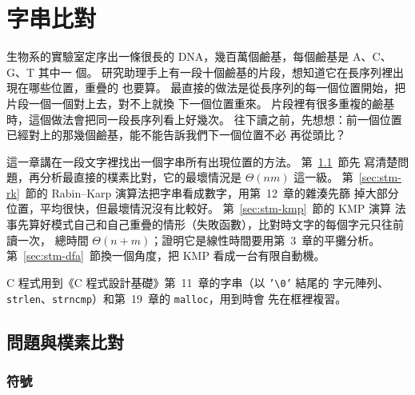 \chapter{字串比對}
\label{ch:stringmatching}


生物系的實驗室定序出一條很長的 DNA，幾百萬個鹼基，每個鹼基是 A、C、G、T 其中一
個。 研究助理手上有一段十個鹼基的片段，想知道它在長序列裡出現在哪些位置，重疊的
也要算。 最直接的做法是從長序列的每一個位置開始，把片段一個一個對上去，對不上就換
下一個位置重來。 片段裡有很多重複的鹼基時，這個做法會把同一段長序列看上好幾次。
往下讀之前，先想想：前一個位置已經對上的那幾個鹼基，能不能告訴我們下一個位置不必
再從頭比？

這一章講在一段文字裡找出一個字串所有出現位置的方法。 第~\ref{sec:stm-naive}~節先
寫清楚問題，再分析最直接的樸素比對，它的最壞情況是 $\Theta(nm)$ 這一級。
第~\ref{sec:stm-rk}~節的 Rabin--Karp 演算法把字串看成數字，用第~12~章的雜湊先篩
掉大部分位置，平均很快，但最壞情況沒有比較好。 第~\ref{sec:stm-kmp}~節的 KMP 演算
法事先算好模式自己和自己重疊的情形（失敗函數），比對時文字的每個字元只往前讀一次，
總時間 $\Theta(n + m)$；證明它是線性時間要用第~3~章的平攤分析。
第~\ref{sec:stm-dfa}~節換一個角度，把 KMP 看成一台有限自動機。

C 程式用到《C 程式設計基礎》第~11~章的字串（以 \texttt{'\textbackslash 0'} 結尾的
字元陣列、\texttt{strlen}、\texttt{strncmp}）和第~19~章的 \texttt{malloc}，用到時會
先在框裡複習。

\section{問題與樸素比對}
\label{sec:stm-naive}

\subsection{符號}

